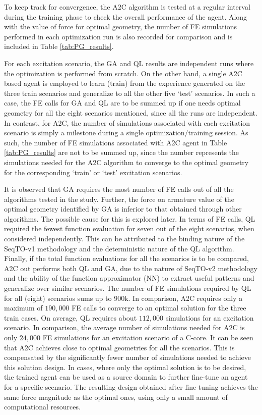 To keep track for convergence, the A2C algorithm is tested at a regular interval during the training phase to check the overall performance of the agent. Along with the value of force for optimal geometry, the number of FE simulations performed in each optimization run is also recorded for comparison and is included in Table \ref{tab:PG_results}. 

For each excitation scenario, the GA and QL results are independent runs where the optimization is performed from scratch. On the other hand, a single A2C based agent is employed to learn (train) from the experience generated on the three train scenarios and generalize to all the other five `test' scenarios. In such a case, the FE calls for GA and QL are to be summed up if one needs optimal geometry for all the eight scenarios mentioned, since all the runs are independent. In contrast, for A2C, the number of simulations associated with each excitation scenario is simply a milestone during a single optimization/training session. 
As such, the number of FE simulations associated with A2C agent in Table \ref{tab:PG_results} are not to be summed up, since the number represents the simulations needed for the A2C algorithm to converge to the optimal geometry for the corresponding `train' or `test' excitation scenarios. 

It is observed that GA requires the most number of FE calls out of all the algorithms tested in the study. Further, the force on armature value of the optimal geometry identified by GA is inferior to that obtained through other algorithms. The possible cause for this is explored later. In terms of FE calls, QL required the fewest function evaluation for seven out of the eight scenarios, when considered independently. 
This can be attributed to the binding nature of the SeqTO-v1 methodology and the deterministic nature of the QL algorithm. 
Finally, if the total function evaluations for all the scenarios is to be compared, A2C out performs both QL and GA, due to the nature of SeqTO-v2 methodology and the ability of the function approximator (NN) to extract useful patterns and generalize over similar scenarios. The number of FE simulations required by QL for all (eight) scenarios sums up to 900k. 
In comparison, A2C requires only a maximum of $190,000$ FE calls to converge to an optimal solution for the three train cases. On average, QL requires about $112,000$ simulations for an excitation scenario. In comparison, the average number of simulations needed for A2C is only $24, 000$ FE simulations for an excitation scenario of a C-core. 
It can be seen that A2C achieves close to optimal geometries for all the scenarios. This is compensated by the significantly fewer number of simulations needed to achieve this solution design. In cases, where only the optimal solution is to be desired, the trained agent can be used as a source domain to further fine-tune an agent for a specific scenario. The resulting design obtained after fine-tuning achieves the same force magnitude as the optimal ones, using only a small amount of computational resources.

